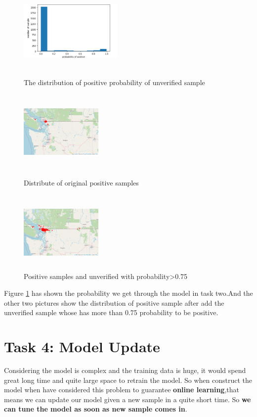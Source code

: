 \documentclass[12pt]{article}
\begin{document}
\begin{figure}[H]
	\small
	\centering
	\begin{minipage}{5cm}
		\label{prob}
		\includegraphics[width=5cm,height=4cm]{./pictures/prob.png}
		\caption{The distribution of positive probability of unverified sample} 
	\end{minipage}
	\begin{minipage}{4cm}
		\includegraphics[width=4cm,height=4cm]{./pictures/pos.png}
		\caption{Distribute of original positive samples}
	\end{minipage}
	\begin{minipage}{4cm}
		\includegraphics[width=4cm,height=4cm]{./pictures/addun.png}
		\caption{Positive samples and unverified with probability>0.75}
	\end{minipage}
\end{figure}
Figure \ref{prob} has shown the probability we get through the model in task two.And the other two pictures show the distribution of positive sample after add the unverified sample whose has more than 0.75 probability to be positive.


\section{Task 4: Model Update}
Considering the model is complex and the training data is huge, it would spend great long time and quite large space to retrain the model. So when construct the model when have considered this problem to guarantee \textbf{online learning},that means we can update our model given a new sample in a quite short time. So \textbf{we can tune the model as soon as new sample comes in}.
\end{document}
